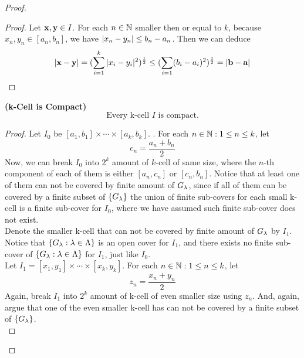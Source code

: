 \documentclass{report}
\begin{document}
\begin{proof}
\begin{lemma}
\end{lemma}
\begin{proof}
Let $\textbf{x},\textbf{y}\in I$. For each $n\in\mathbb{N}$ smaller then or equal to $k$,  because $x_n,y_n\in [a_n,b_n]$, we have $|x_n-y_n|\leq b_n-a_n$. Then we can deduce
\begin{equation}
|\textbf{x}-\textbf{y}|=(\sum_{i=1}^k |x_i-y_i|^2)^{\frac{1}{2}}\leq (\sum_{i=1} (b_i-a_i)^2)^{\frac{1}{2}}=|\textbf{b}-\textbf{a}|
\end{equation}
\end{proof}
\begin{theorem}
\label{3.8.4}
\textbf{(k-Cell is Compact)} 
\begin{equation}
\text{ Every k-cell $I$ is compact. }
\end{equation}
\end{theorem}
\begin{proof}
Let $I_0$ be $[a_1,b_1]\times \cdots \times [a_k,b_k]$. . For each $n\in\mathbb{N}: 1\leq n\leq k$, let 
\begin{equation}
c_n=\frac{a_n+b_n}{2}
\end{equation}
Now, we can break $I_0$ into  $2^k$ amount of  $k$-cell of same size, where the $n$-th component of each of them is either  $[a_n,c_n]$ or $[c_n,b_n]$. Notice that at least one of them can not be covered by finite amount of $G_\lambda$, since if all of them can be covered by a finite subset of $\{ G_\lambda \}$ the union of finite sub-covers for each small k-cell is a finite sub-cover for $I_0$, where we have assumed such finite sub-cover does not exist.\\

Denote the smaller k-cell that can not be covered by finite amount of $G_\lambda$ by $I_1$. Notice that $\{ G_\lambda:\lambda\in\Lambda   \}$ is an open cover for $I_1$, and there exists no finite sub-cover of $\{ G_\lambda :\lambda\in \Lambda  \}$ for $I_1$, just like  $I_0$.\\

Let $I_1=[x_1,y_1]\times\cdots\times[x_k,y_k]$. For each $n\in\mathbb{N}:1\leq n\leq k$, let
\begin{equation}
z_n=\frac{x_n+y_n}{2}
\end{equation}
Again, break  $I_1$ into  $2^k$ amount of k-cell of even smaller size using $z_n$. And, again, argue that one of the even smaller k-cell has can not be covered by a finite subset of $\{ G_\lambda  \}$.\\


\end{proof}
\end{proof}
\end{document}
